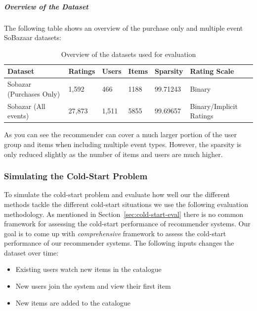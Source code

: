 \subparagraph{Overview of the Dataset}

The following table shows an overview of the purchase only and multiple event SoBazaar datasets:


\begin{table}[H]
    \centering
    \begin{tabular}{l l l l l l }
    \toprule
	Dataset						& 	Ratings		& 	Users		& 	Items 		& 	Sparsity			& Rating Scale 				    \\ \midrule
	Sobazar	(Purchases Only) 	&	1,592		&	466			&	1188		&	99.71243			& Binary						\\
	Sobazar (All events)		& 	27,873  	& 	1,511		&	5855		& 	99.69657			& Binary/Implicit Ratings		\\
	\bottomrule
    \end{tabular}
    \caption [Overview of the datasets used for evaluation]{Overview of the datasets used for evaluation}
    \label{table:datasets}
\end{table}

As you can see the recommender can cover a much larger portion of the user group and items when including multiple event types. However,
the sparsity is only reduced slightly as the number of items and users are much higher.

\subsubsection{Simulating the Cold-Start Problem}

To simulate the cold-start problem and evaluate how well our the different
methods tackle the different cold-start situations we use the following
evaluation methodology. As mentioned in Section~\ref{sec:cold-start-eval} there
is no common framework for assessing the cold-start performance of recommender
systems.  Our goal is to come up with \emph{comprehensive} framework to assess
the cold-start performance of our recommender systems. The following inputs
changes the dataset over time:

\begin{itemize}
	\item 	Existing users watch new items in the catalogue
	\item	New users join the system and view their first item
	\item	New items are added to the catalogue
\end{itemize}

